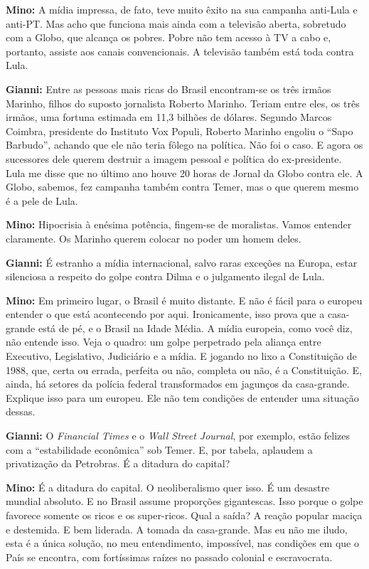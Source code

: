 \textbf{Mino:} A mídia impressa, de fato, teve muito êxito na sua
campanha anti-Lula e anti-PT. Mas acho que funciona mais ainda com a
televisão aberta, sobretudo com a Globo, que alcança os pobres. Pobre
não tem acesso à TV a cabo e, portanto, assiste aos canais
convencionais. A televisão também está toda contra Lula.

\textbf{Gianni:} Entre as pessoas mais ricas do Brasil encontram-se os
três irmãos Marinho, filhos do suposto jornalista Roberto Marinho.
Teriam entre eles, os três irmãos, uma fortuna estimada em 11,3 bilhões
de dólares. Segundo Marcos Coimbra, presidente do Instituto Vox Populi,
Roberto Marinho engoliu o ``Sapo Barbudo'', achando que ele não teria
fôlego na política. Não foi o caso. E agora os sucessores dele querem
destruir a imagem pessoal e política do ex-presidente. Lula me disse que
no último ano houve 20 horas de Jornal da Globo contra ele. A Globo,
sabemos, fez campanha também contra Temer, mas o que querem mesmo é a
pele de Lula.

\textbf{Mino:} Hipocrisia à enésima potência, fingem-se de moralistas.
Vamos entender claramente. Os Marinho querem colocar no poder um homem
deles.

\textbf{Gianni:} É estranho a mídia internacional, salvo raras exceções
na Europa, estar silenciosa a respeito do golpe contra Dilma e o
julgamento ilegal de Lula.

\textbf{Mino:} Em primeiro lugar, o Brasil é muito distante. E não é
fácil para o europeu entender o que está acontecendo por aqui.
Ironicamente, isso prova que a casa-grande está de pé, e o Brasil na
Idade Média. A mídia europeia, como você diz, não entende isso. Veja o
quadro: um golpe perpetrado pela aliança entre Executivo, Legislativo,
Judiciário e a mídia. E jogando no lixo a Constituição de 1988, que,
certa ou errada, perfeita ou não, completa ou não, é a Constituição. E,
ainda, há setores da polícia federal transformados em jagunços da
casa-grande. Explique isso para um europeu. Ele não tem condições de
entender uma situação dessas.

\textbf{Gianni:} O \emph{Financial Times} e o \emph{Wall Street
Journal}, por exemplo, estão felizes com a ``estabilidade econômica''
sob Temer. E, por tabela, aplaudem a privatização da Petrobras. É a
ditadura do capital?

\textbf{Mino:} É a ditadura do capital. O neoliberalismo quer isso. É um
desastre mundial absoluto. E no Brasil assume proporções gigantescas.
Isso porque o golpe favorece somente os ricos e os super-ricos. Qual a
saída? A reação popular maciça e destemida. E bem liderada. A tomada da
casa-grande. Mas eu não me iludo, esta é a única solução, no meu
entendimento, impossível, nas condições em que o País se encontra, com
fortíssimas raízes no passado colonial e escravocrata.

